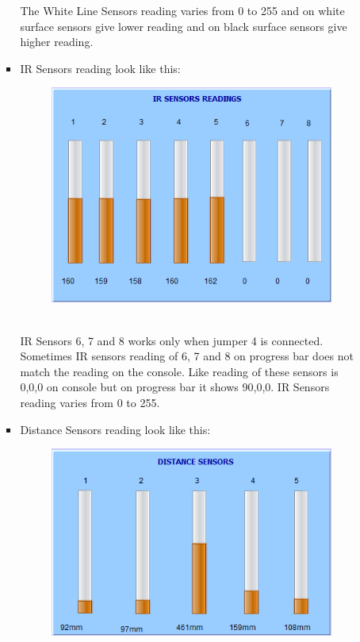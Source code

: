 \documentclass{article}
\begin{document}
\begin{enumerate}
\begin{itemize}
\begin{itemize}
\begin{figure}[h]
\begin{center}
					\end{center}
				\end{figure}
				The White Line Sensors reading varies from 0 to 255 and on white surface sensors give lower reading and on black surface sensors give higher reading.
				\newpage
				\item IR Sensors reading look like this: \\ 
				\begin{figure}[h]
					\begin{center}
						\includegraphics[scale=0.75]{irsensor.png}
					\end{center} 
				\end{figure} \\
				IR Sensors 6, 7 and 8 works only when jumper 4 is connected. Sometimes IR sensors reading of 6, 7 and 8 on progress bar does not match the reading on the console. Like reading of these sensors is 0,0,0 on console but on progress bar it shows 90,0,0. IR Sensors reading varies from 0 to 255.
				\newpage
				\item Distance Sensors reading look like this: \\
				\begin{figure}[h]
					\begin{center}
						\includegraphics[scale=0.75]{distance_sensor.png}

\end{center}
\end{figure}
\end{itemize}
\end{itemize}
\end{enumerate}
\end{document}
